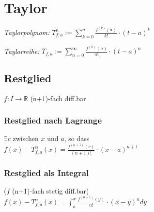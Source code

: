 \section*{Taylor}

\textit{Taylorpolynom:}
$\displaystyle T_{f,a}^n := \sum_{k=0}^n\frac{f^{(k)}(a)}{k!}\cdot(t-a)^k$

\textit{Taylorreihe:}
$\displaystyle T_{f,a} := \sum_{n=0}^\infty\frac{f^{(n)}(a)}{n!}\cdot(t-a)^n$

\subsection*{Restglied}
$f: I\to\mathbb{R}$ (n+1)-fach diff.bar

\subsubsection*{Restglied nach Lagrange}
$\exists c$ zwischen $x$ und $a$, so dass \\
$f(x)-T_{f,a}^n(x)=\frac{f^{(n+1)}(c)}{(n+1)!}\cdot(x-a)^{n+1}$

\subsubsection*{Restglied als Integral}
($f$ (n+1)-fach stetig diff.bar)\\
$f(x)-T_{f,a}^n(x)=\int_a^x\frac{f^{(n+1)}(y)}{n!}\cdot(x-y)^ndy$
